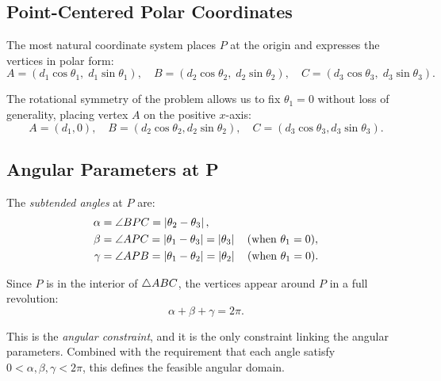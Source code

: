 \subsection{Point-Centered Polar Coordinates}

The most natural coordinate system places $P$ at the origin and expresses the vertices in polar form:
\begin{equation}
\label{eq:polar-coords}
A = (d_1 \cos\theta_1, \; d_1 \sin\theta_1), \quad
B = (d_2 \cos\theta_2, \; d_2 \sin\theta_2), \quad
C = (d_3 \cos\theta_3, \; d_3 \sin\theta_3).
\end{equation}

\begin{remark}
The rotational symmetry of the problem allows us to fix $\theta_1 = 0$ without loss of generality, placing vertex $A$ on the positive $x$-axis:
\begin{equation}
\label{eq:fix-rotation}
A = (d_1, 0), \quad B = (d_2\cos\theta_2, d_2\sin\theta_2), \quad C = (d_3\cos\theta_3, d_3\sin\theta_3).
\end{equation}
\end{remark}

\subsection{Angular Parameters at P}

\begin{definition}
The \emph{subtended angles} at $P$ are:
\begin{align}
\alpha &= \angle BPC = \left\lvert \theta_2 - \theta_3 \right\rvert, \\
\beta &= \angle APC = \left\lvert \theta_1 - \theta_3 \right\rvert = \left\lvert \theta_3 \right\rvert \quad (\text{when } \theta_1 = 0), \\
\gamma &= \angle APB = \left\lvert \theta_1 - \theta_2 \right\rvert = \left\lvert \theta_2 \right\rvert \quad (\text{when } \theta_1 = 0).
\end{align}
\end{definition}

Since $P$ is in the interior of $\triangle ABC$, the vertices appear around $P$ in a full revolution:
\begin{equation}
\label{eq:angle-sum}
\alpha + \beta + \gamma = 2\pi.
\end{equation}

This is the \emph{angular constraint}, and it is the only constraint linking the angular parameters. Combined with the requirement that each angle satisfy $0 < \alpha, \beta, \gamma < 2\pi$, this defines the feasible angular domain.

